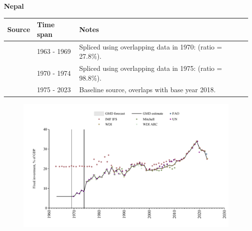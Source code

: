 \documentclass[12pt,a4paper,landscape]{article}
\begin{document}
\begin{adjustbox}{max totalsize={\paperwidth}{\paperheight},center}
\begin{minipage}[t][\textheight][t]{\textwidth}
\vspace*{0.5cm}
{}
\begin{center}
{\Large\bfseries Nepal}
\end{center}
\vspace{0.5cm}
\begin{table}[H]
\centering
\small
\begin{tabular}{|l|l|l|}
\hline
\textbf{Source} & \textbf{Time span} & \textbf{Notes} \\
\hline
\rowcolor{white}\cite{IMF_IFS}& 1963 - 1969 &Spliced using overlapping data in 1970: (ratio = 27.8\%).\\
\rowcolor{lightgray}\cite{UN}& 1970 - 1974 &Spliced using overlapping data in 1975: (ratio = 98.8\%).\\
\rowcolor{white}\cite{WDI}& 1975 - 2023 &Baseline source, overlaps with base year 2018.\\
\hline
\end{tabular}
\end{table}
\begin{figure}[H]
\centering
\includegraphics[width=\textwidth,height=0.6\textheight,keepaspectratio]{graphs/NPL_finv_GDP.pdf}
\end{figure}
\end{minipage}
\end{adjustbox}
\end{document}
